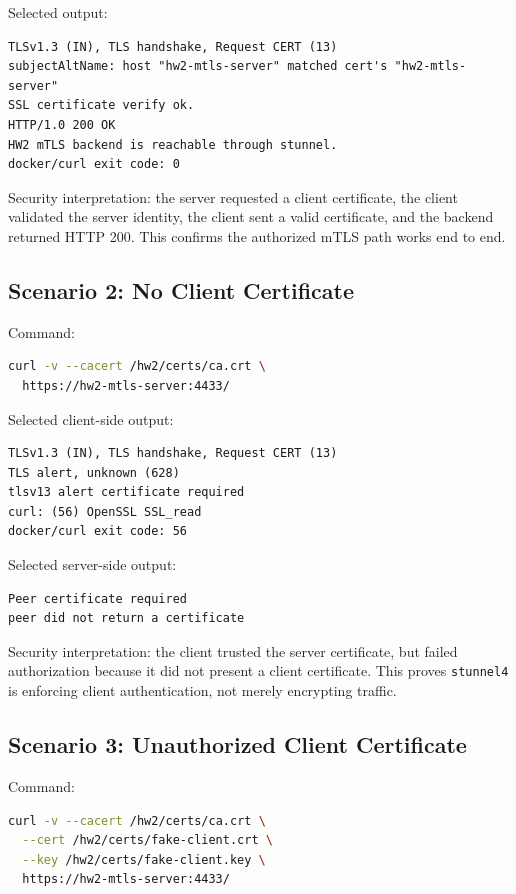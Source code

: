 \documentclass[11pt]{article}
\begin{document}
Selected output:

\begin{lstlisting}
TLSv1.3 (IN), TLS handshake, Request CERT (13)
subjectAltName: host "hw2-mtls-server" matched cert's "hw2-mtls-server"
SSL certificate verify ok.
HTTP/1.0 200 OK
HW2 mTLS backend is reachable through stunnel.
docker/curl exit code: 0
\end{lstlisting}

Security interpretation: the server requested a client certificate, the client validated the server identity, the client sent a valid certificate, and the backend returned HTTP 200. This confirms the authorized mTLS path works end to end.

\subsection{Scenario 2: No Client Certificate}

Command:

\begin{lstlisting}[language=bash]
curl -v --cacert /hw2/certs/ca.crt \
  https://hw2-mtls-server:4433/
\end{lstlisting}

Selected client-side output:

\begin{lstlisting}
TLSv1.3 (IN), TLS handshake, Request CERT (13)
TLS alert, unknown (628)
tlsv13 alert certificate required
curl: (56) OpenSSL SSL_read
docker/curl exit code: 56
\end{lstlisting}

Selected server-side output:

\begin{lstlisting}
Peer certificate required
peer did not return a certificate
\end{lstlisting}

Security interpretation: the client trusted the server certificate, but failed authorization because it did not present a client certificate. This proves \texttt{stunnel4} is enforcing client authentication, not merely encrypting traffic.

\subsection{Scenario 3: Unauthorized Client Certificate}

Command:

\begin{lstlisting}[language=bash]
curl -v --cacert /hw2/certs/ca.crt \
  --cert /hw2/certs/fake-client.crt \
  --key /hw2/certs/fake-client.key \
  https://hw2-mtls-server:4433/
\end{lstlisting}
\end{document}
